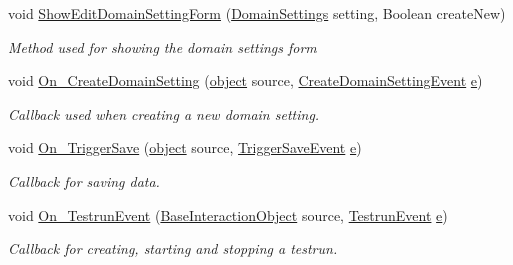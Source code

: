 \begin{DoxyCompactItemize}
void \hyperlink{class_web_analyzer_1_1_controller_1_1_main_controller_a322327d4830f454e5841132b8dc99416}{Show\+Edit\+Domain\+Setting\+Form} (\hyperlink{class_web_analyzer_1_1_models_1_1_settings_model_1_1_domain_settings}{Domain\+Settings} setting, Boolean create\+New)
\begin{DoxyCompactList}\small\item\em Method used for showing the domain settings form \end{DoxyCompactList}\item 
void \hyperlink{class_web_analyzer_1_1_controller_1_1_main_controller_aaec17c78ea87f6af50faa3fa08f5c551}{On\+\_\+\+Create\+Domain\+Setting} (\hyperlink{_u_i_2_h_t_m_l_resources_2js_2lib_2underscore_8min_8js_aae18b7515bb2bc4137586506e7c0c903}{object} source, \hyperlink{class_web_analyzer_1_1_events_1_1_create_domain_setting_event}{Create\+Domain\+Setting\+Event} \hyperlink{_u_i_2_h_t_m_l_resources_2js_2lib_2bootstrap_8min_8js_ab5902775854a8b8440bcd25e0fe1c120}{e})
\begin{DoxyCompactList}\small\item\em Callback used when creating a new domain setting. \end{DoxyCompactList}\item 
void \hyperlink{class_web_analyzer_1_1_controller_1_1_main_controller_aadab56b24729cdfeeac6474825289c83}{On\+\_\+\+Trigger\+Save} (\hyperlink{_u_i_2_h_t_m_l_resources_2js_2lib_2underscore_8min_8js_aae18b7515bb2bc4137586506e7c0c903}{object} source, \hyperlink{class_web_analyzer_1_1_events_1_1_trigger_save_event}{Trigger\+Save\+Event} \hyperlink{_u_i_2_h_t_m_l_resources_2js_2lib_2bootstrap_8min_8js_ab5902775854a8b8440bcd25e0fe1c120}{e})
\begin{DoxyCompactList}\small\item\em Callback for saving data. \end{DoxyCompactList}\item 
void \hyperlink{class_web_analyzer_1_1_controller_1_1_main_controller_a8f86c27064bd088e28cf0aa0308bda2b}{On\+\_\+\+Testrun\+Event} (\hyperlink{class_web_analyzer_1_1_u_i_1_1_interaction_objects_1_1_base_interaction_object}{Base\+Interaction\+Object} source, \hyperlink{class_web_analyzer_1_1_events_1_1_testrun_event}{Testrun\+Event} \hyperlink{_u_i_2_h_t_m_l_resources_2js_2lib_2bootstrap_8min_8js_ab5902775854a8b8440bcd25e0fe1c120}{e})
\begin{DoxyCompactList}\small\item\em Callback for creating, starting and stopping a testrun. \end{DoxyCompactList}\item 

\end{DoxyCompactItemize}
